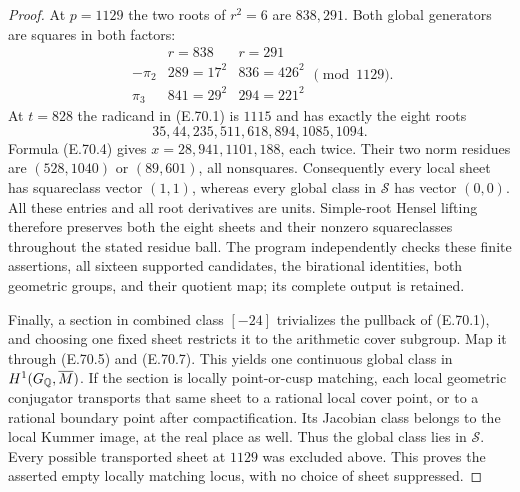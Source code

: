 \begin{proof}
At $p=1129$ the two roots of $r^2=6$ are $838,291$.
Both global generators are squares in both factors:
\[
\begin{array}{c|cc}
 &r=838&r=291\\\hline
 -\pi_2&289=17^2&836=426^2\\
 \pi_3&841=29^2&294=221^2
\end{array}\pmod{1129}.
 \tag{E.70.12}
\]
At $t=828$ the radicand in (E.70.1) is $1115$ and has
exactly the eight roots
\[
 35,44,235,511,618,894,1085,1094.
\]
Formula (E.70.4)
gives $x=28,941,1101,188$, each twice. Their two norm
residues are $(528,1040)$ or $(89,601)$, all nonsquares.
Consequently every local sheet has squareclass vector $(1,1)$,
whereas every global class in $\mathcal S$ has vector $(0,0)$.
All these entries and all root derivatives are units. Simple-root
Hensel lifting therefore preserves both the eight sheets and
their nonzero squareclasses throughout the stated residue ball.
The program  independently
checks these finite assertions, all sixteen supported candidates,
the birational identities, both geometric groups, and their
quotient map; its complete output is retained.

Finally, a section in combined class $[-24]$ trivializes the
pullback of (E.70.1), and choosing one fixed sheet restricts it
to the arithmetic cover subgroup. Map it through (E.70.5) and
(E.70.7). This yields one continuous global class in
$H^1(G_\mathbb Q,\overline M)$. If the section is locally point-or-cusp
matching, each local geometric conjugator transports that same
sheet to a rational local cover point, or to a rational boundary
point after compactification. Its Jacobian class belongs to the
local Kummer image, at the real place as well. Thus the global
class lies in $\mathcal S$. Every possible transported sheet
at $1129$ was excluded above. This proves the asserted empty
locally matching locus, with no choice of sheet suppressed.
\end{proof}

